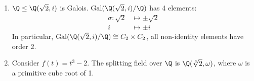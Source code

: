 \documentclass{article}
\DeclareMathOperator{\Gal}{Gal}
\begin{document}
\begin{eg}
    \begin{enumerate}[label=(\arabic*)]
        \item $\Q \leq \Q(\sqrt{2}, i)$ is Galois. $\Gal(\Q(\sqrt{2}, i)/\Q)$ has 4 elements:
            \begin{align*}
                \sigma: \sqrt{2} &\longmapsto \pm \sqrt{2} \\
                               i &\longmapsto \pm i
            \end{align*}
            In particular, $\Gal(\Q(\sqrt{2}, i)/\Q) \cong C_2 \times C_2$, all non-identity elements have order 2.
        \item Consider $f(t) = t^3 - 2$. The splitting field over $\Q$ is $\Q(\sqrt[3]{2}, \omega)$, where $\omega$ is a primitive cube root of 1.


\end{enumerate}
\end{eg}
\end{document}
